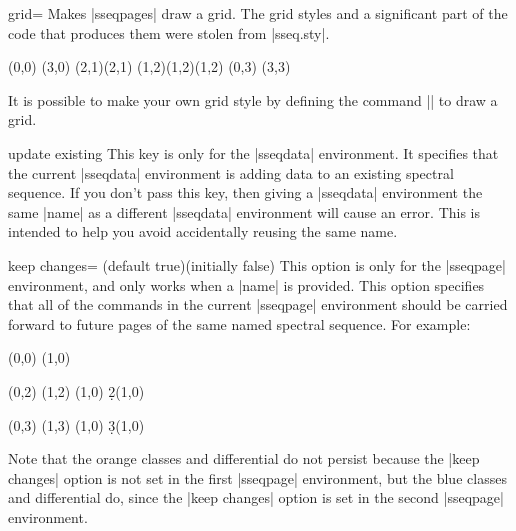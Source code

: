 \documentclass{ltxdoc}
\begin{document}
\begin{sseqdata}[name=ex1,degree={#1}{1-#1}]
\begin{key}{grid=}
Makes |sseqpages| draw a grid. The grid styles and a significant part of the code that produces them were stolen from |sseq.sty|.
\begin{codeexample}[]
\begin{sseqdata}[name=grid example]
\class(0,0)
\class(3,0)
\class(2,1)\class(2,1)
\class(1,2)\class(1,2)\class(1,2)
\class(0,3)
\class(3,3)
\end{sseqdata}
\vbox{
\printpage[name=grid example,grid=chess]
\printpage[name=grid example,grid=crossword]
\printpage[name=grid example,grid=dots]
\newline
\printpage[name=grid example,grid=go]
\printpage[name=grid example,grid=none]
}
\end{codeexample}
It is possible to make your own grid style by defining the command |\sseq@grid@yourgridname| to draw a grid.
\end{key}

\begin{key}{update existing}
This key is only for the |sseqdata| environment. It specifies that the current |sseqdata| environment is adding data to an existing spectral sequence. If you don't pass this key, then giving a |sseqdata| environment the same |name| as a different |sseqdata| environment will cause an error. This is intended to help you avoid accidentally reusing the same name.
\end{key}


\begin{key}{keep changes= (default true)(initially false)}
This option is only for the |sseqpage| environment, and only works when a |name| is provided.
This option specifies that all of the commands in the current |sseqpage| environment should be carried forward to future pages of the same named spectral sequence. For example:
\begin{codeexample}[]
\begin{sseqdata}[name=keep changes example,Adams grading,y range={0}{3}]
\class(0,0)
\class(1,0)
\end{sseqdata}

\begin{sseqpage}[name=keep changes example,sseq=orange]
\class(0,2)
\class(1,2)
\classoptions[orange](1,0)
\d2(1,0)
\end{sseqpage}
%
\hskip1cm
%
\begin{sseqpage}[name=keep changes example,sseq=blue,keep changes]
\class(0,3)
\class(1,3)
\classoptions[blue](1,0)
\d3(1,0)
\end{sseqpage}
%
\hskip1cm
%
\printpage[name=keep changes example,page=3]
\end{codeexample}
Note that the orange classes and differential do not persist because the |keep changes| option is not set in the first |sseqpage| environment, but the blue classes and differential do, since the |keep changes| option is set in the second |sseqpage| environment.
\end{key}


\end{sseqdata}
\end{document}
